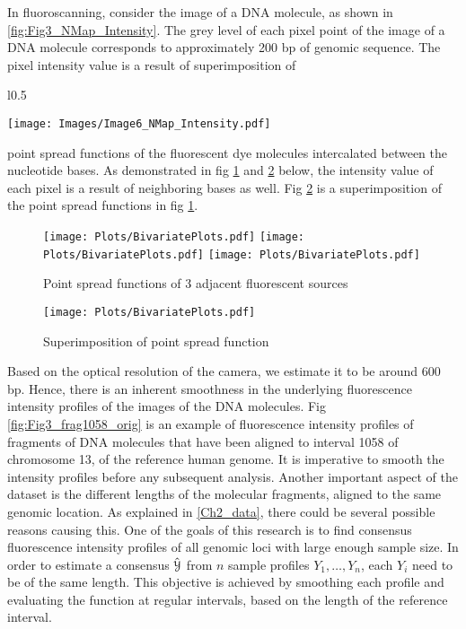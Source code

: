 In fluoroscanning, consider the image of a DNA molecule, as shown in \ref{fig:Fig3_NMap_Intensity}. The grey level of each pixel point of the image of a DNA molecule corresponds to approximately 200 bp of genomic sequence. The pixel intensity value is a result of superimposition of 
\begin{wrapfigure}{l}{0.5\textwidth}
\begin{center}
\texttt{[image: Images/Image6\_NMap\_Intensity.pdf]}
\end{center}
\caption{Image of DNA molecule}
\label{fig:Fig3_NMap_Intensity}
\end{wrapfigure}
point spread functions of the fluorescent dye molecules intercalated between the nucleotide bases. As demonstrated in fig \ref{fig:Fig3_Bivariate1} and \ref{fig:Fig3_Bivariate2} below, the intensity value of each pixel is a result of neighboring bases as well. Fig \ref{fig:Fig3_Bivariate2} is a superimposition of the point spread functions in fig \ref{fig:Fig3_Bivariate1}.  

\begin{figure}[H]
\begin{center}
\texttt{[image: Plots/BivariatePlots.pdf]}
\texttt{[image: Plots/BivariatePlots.pdf]}
\texttt{[image: Plots/BivariatePlots.pdf]}
\end{center}
\caption{Point spread functions of 3 adjacent fluorescent sources}
\label{fig:Fig3_Bivariate1}
\end{figure}

\begin{figure}[H]
\begin{center}
\texttt{[image: Plots/BivariatePlots.pdf]}
\end{center}
\caption{Superimposition of point spread function}
\label{fig:Fig3_Bivariate2}
\end{figure}
Based on the optical resolution of the camera, we estimate it to be around 600 bp. Hence, there is an inherent smoothness in the underlying fluorescence intensity profiles of the images of the DNA molecules. Fig \ref{fig:Fig3_frag1058_orig} is an example of fluorescence intensity profiles of fragments of DNA molecules that have been aligned to interval 1058 of chromosome 13, of the reference human genome. It is imperative to smooth the intensity profiles before any subsequent analysis. Another important aspect of the dataset is the different lengths of the molecular fragments, aligned to the same genomic location. As explained in \ref{Ch2_data}, there could be several possible reasons causing this. One of the goals of this research is to find consensus fluorescence intensity profiles of all genomic loci with large enough sample size. In order to estimate a consensus $\hat{\mathcal{Y}}$ from $n$ sample profiles $Y_1, \dots, Y_n$, each $Y_i$ need to be of the same length. This objective is achieved by smoothing each profile and evaluating the function at regular intervals, based on the length of the reference interval. 


